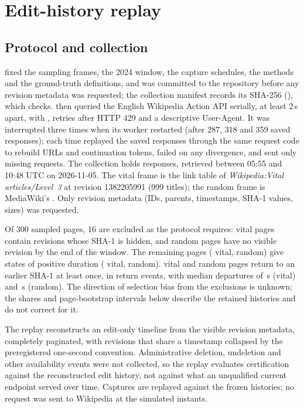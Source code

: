 \section{Edit-history replay}\label{sec:replay}

\subsection{Protocol and collection}
 fixed the sampling frames,
the 2024 window, the capture schedules, the methods and the ground-truth
definitions, and was committed to the repository before any revision metadata
was requested; the collection manifest records its SHA-256
(), which  checks.  then queried the
English Wikipedia Action API serially, at least 2\,s apart, with
, retries after HTTP 429 and a descriptive User-Agent. It was
interrupted three times when its worker restarted (after 287, 318 and 359
saved responses); each time  replayed the saved responses
through the same request code to rebuild URLs and continuation tokens, failed
on any divergence, and sent only missing requests. The collection holds
\nRevisionRequests{} responses, retrieved between 05:55 and 10:48 UTC on
2026-11-05. The vital frame is the link table of \emph{Wikipedia:Vital
articles/Level~3} at revision 1382205991 (999 titles); the random frame is
MediaWiki's . Only revision metadata (IDs, parents,
timestamps, SHA-1 values, sizes) was requested.

Of 300 sampled pages, 16 are excluded as the protocol requires: \nExcludedHidden{}
vital pages contain revisions whose SHA-1 is hidden, and \nExcludedAbsent{}
random pages have no visible revision by the end of the window. The
\nPages{} remaining pages (\nVitalPages{} vital, \nRandomPages{} random) give
\nStates{} states of positive duration (\sStatesVital{} vital,
\sStatesRandom{} random). \sPagesReturnVital{} vital and \sPagesReturnRandom{}
random pages return to an earlier SHA-1 at least once, in \sReturnEvents{}
return events, with median departures of \sMedianVital{}\,s (vital) and
\sMedianRandom{}\,s (random). The direction of selection bias from the
exclusions is unknown; the shares and page-bootstrap intervals below describe
the retained histories and do not correct for it.

The replay reconstructs an edit-only timeline from the visible revision
metadata, completely paginated, with revisions that share a timestamp
collapsed by the preregistered one-second convention. Administrative deletion,
undeletion and other availability events were not collected, so the replay
evaluates certification against the reconstructed edit history, not against
what an unqualified current endpoint served over time. Captures are replayed
against the frozen histories; no request was sent to Wikipedia at the
simulated instants.

